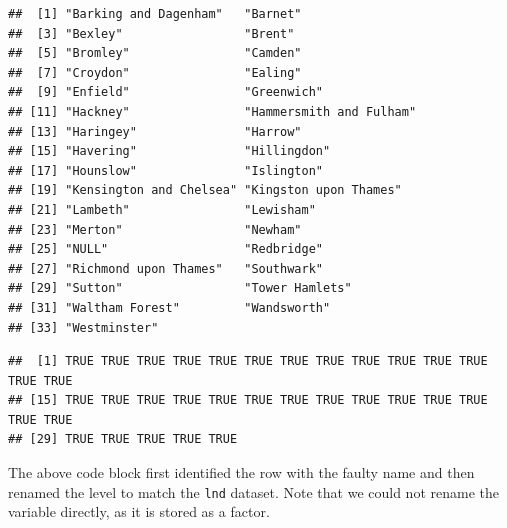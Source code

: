 \documentclass[]{article}
\newenvironment{Shaded}{}{}
\newcommand{\KeywordTok}[1]{\textcolor[rgb]{0.00,0.44,0.13}{\textbf{{#1}}}}
\newcommand{\DecValTok}[1]{\textcolor[rgb]{0.25,0.63,0.44}{{#1}}}
\newcommand{\CommentTok}[1]{\textcolor[rgb]{0.38,0.63,0.69}{\textit{{#1}}}}
\newcommand{\NormalTok}[1]{{#1}}
\begin{document}
\begin{Shaded}
\end{Shaded}
\begin{verbatim}
##  [1] "Barking and Dagenham"   "Barnet"                
##  [3] "Bexley"                 "Brent"                 
##  [5] "Bromley"                "Camden"                
##  [7] "Croydon"                "Ealing"                
##  [9] "Enfield"                "Greenwich"             
## [11] "Hackney"                "Hammersmith and Fulham"
## [13] "Haringey"               "Harrow"                
## [15] "Havering"               "Hillingdon"            
## [17] "Hounslow"               "Islington"             
## [19] "Kensington and Chelsea" "Kingston upon Thames"  
## [21] "Lambeth"                "Lewisham"              
## [23] "Merton"                 "Newham"                
## [25] "NULL"                   "Redbridge"             
## [27] "Richmond upon Thames"   "Southwark"             
## [29] "Sutton"                 "Tower Hamlets"         
## [31] "Waltham Forest"         "Wandsworth"            
## [33] "Westminster"
\end{verbatim}
\begin{Shaded}
\end{Shaded}
\begin{verbatim}
##  [1] TRUE TRUE TRUE TRUE TRUE TRUE TRUE TRUE TRUE TRUE TRUE TRUE TRUE TRUE
## [15] TRUE TRUE TRUE TRUE TRUE TRUE TRUE TRUE TRUE TRUE TRUE TRUE TRUE TRUE
## [29] TRUE TRUE TRUE TRUE TRUE
\end{verbatim}
The above code block first identified the row with the faulty name and
then renamed the level to match the \texttt{lnd} dataset. Note that we
could not rename the variable directly, as it is stored as a factor.
\end{document}
